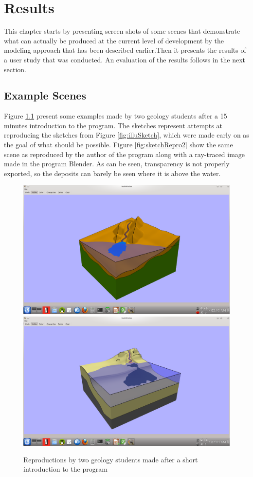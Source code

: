 \documentclass[a4paper,12pt]{report}
\begin{document}
\chapter{Results}
This chapter starts by presenting screen shots of some scenes that demonstrate what can actually be produced at the current level of development by the modeling approach that has been described earlier.Then it presents the results of a user study that was conducted. An evaluation of the results follows in the next section. 
\label{sec:results}

\section{Example Scenes}
Figure \ref{fig:sketchRepro} present some examples made by two geology students after a 15 minutes introduction to the program. The sketches represent attempts at reproducing the sketches from Figure \ref{fig:illuSketch}, which were made early on as the goal of what should be possible. Figure \ref{fig:sketchRepro2} show the same scene as reproduced by the author of the program along with a ray-traced image made in the program Blender. As can be seen, transparency is not properly exported, so the deposits can barely be seen where it is above the water.

\begin{figure}
\includegraphics[trim = 90mm 22mm 80mm 30mm, clip,width=.5\linewidth]{thesis/resultsSection/sketch/user.png}
\includegraphics[trim = 90mm 22mm 80mm 30mm, clip,width=.5\linewidth]{thesis/resultsSection/sketch/user2.png}
 \caption{Reproductions by two geology students made after a short introduction to the program}
 \label{fig:sketchRepro}
\end{figure}
\end{document}
